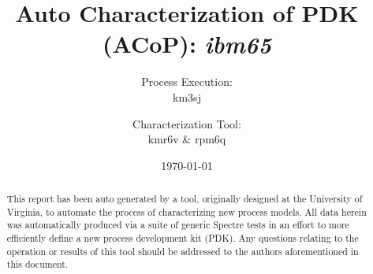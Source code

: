 \documentclass[letterpaper]{article}
\title{Auto Characterization of PDK (ACoP): \emph{ibm65}}
\author{Process Execution: \\km3sj \and Characterization Tool: \\kmr6v \& rpm6q}
\date{\today}
\begin{document}


\maketitle
\begin{abstract}
This report has been auto generated by a tool, originally designed at the University of Virginia, to automate the process of characterizing new process models. All data herein was automatically produced via a suite of generic Spectre tests in an effort to more efficiently define a new process development kit (PDK). Any questions relating to the operation or results of this tool should be addressed to the authors aforementioned in this document.
\end{abstract}

\newpage
\listoffigures 
\newpage
\end{document}
